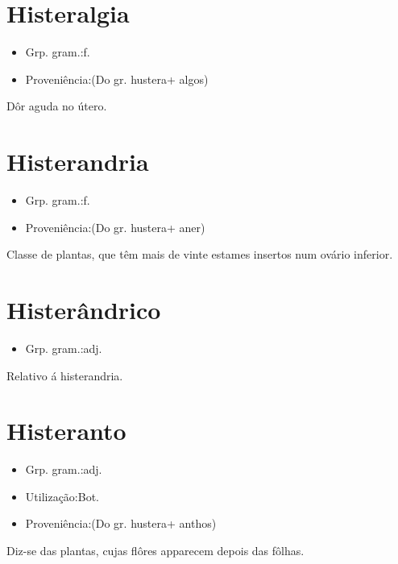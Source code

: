 \documentclass{article}
\begin{document}
\section{Histeralgia}
\begin{itemize}
\item {Grp. gram.:f.}
\end{itemize}
\begin{itemize}
\item {Proveniência:(Do gr. \textunderscore hustera\textunderscore  + \textunderscore algos\textunderscore )}
\end{itemize}
Dôr aguda no útero.
\section{Histerandria}
\begin{itemize}
\item {Grp. gram.:f.}
\end{itemize}
\begin{itemize}
\item {Proveniência:(Do gr. \textunderscore hustera\textunderscore  + \textunderscore aner\textunderscore )}
\end{itemize}
Classe de plantas, que têm mais de vinte estames insertos num ovário inferior.
\section{Histerândrico}
\begin{itemize}
\item {Grp. gram.:adj.}
\end{itemize}
Relativo á histerandria.
\section{Histeranto}
\begin{itemize}
\item {Grp. gram.:adj.}
\end{itemize}
\begin{itemize}
\item {Utilização:Bot.}
\end{itemize}
\begin{itemize}
\item {Proveniência:(Do gr. \textunderscore hustera\textunderscore  + \textunderscore anthos\textunderscore )}
\end{itemize}
Diz-se das plantas, cujas flôres apparecem depois das fôlhas.
\end{document}
